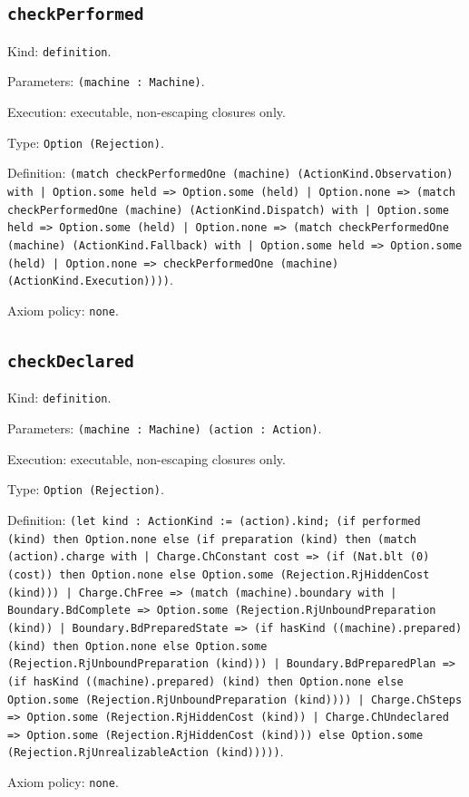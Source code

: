 \documentclass[11pt]{article}
\begin{document}
\subsection*{\texttt{checkPerformed}}
\noindent Kind: \texttt{definition}.\par
\noindent Parameters: \texttt{(machine : Machine)}.\par
\noindent Execution: executable, non-escaping closures only.\par
\noindent Type: \texttt{Option (Rejection)}.\par
\noindent Definition: \texttt{(match checkPerformedOne (machine) (ActionKind.Observation) with | Option.some held => Option.some (held) | Option.none => (match checkPerformedOne (machine) (ActionKind.Dispatch) with | Option.some held => Option.some (held) | Option.none => (match checkPerformedOne (machine) (ActionKind.Fallback) with | Option.some held => Option.some (held) | Option.none => checkPerformedOne (machine) (ActionKind.Execution))))}.\par
\noindent Axiom policy: \texttt{none}.\par
\subsection*{\texttt{checkDeclared}}
\noindent Kind: \texttt{definition}.\par
\noindent Parameters: \texttt{(machine : Machine) (action : Action)}.\par
\noindent Execution: executable, non-escaping closures only.\par
\noindent Type: \texttt{Option (Rejection)}.\par
\noindent Definition: \texttt{(let kind : ActionKind := (action).kind; (if performed (kind) then Option.none else (if preparation (kind) then (match (action).charge with | Charge.ChConstant cost => (if (Nat.blt (0) (cost)) then Option.none else Option.some (Rejection.RjHiddenCost (kind))) | Charge.ChFree => (match (machine).boundary with | Boundary.BdComplete => Option.some (Rejection.RjUnboundPreparation (kind)) | Boundary.BdPreparedState => (if hasKind ((machine).prepared) (kind) then Option.none else Option.some (Rejection.RjUnboundPreparation (kind))) | Boundary.BdPreparedPlan => (if hasKind ((machine).prepared) (kind) then Option.none else Option.some (Rejection.RjUnboundPreparation (kind)))) | Charge.ChSteps => Option.some (Rejection.RjHiddenCost (kind)) | Charge.ChUndeclared => Option.some (Rejection.RjHiddenCost (kind))) else Option.some (Rejection.RjUnrealizableAction (kind)))))}.\par
\noindent Axiom policy: \texttt{none}.\par
\end{document}
